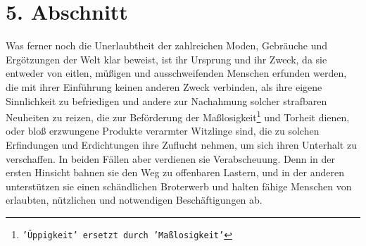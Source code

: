 \section{5. Abschnitt} \label{kap17_ab5}

Was ferner noch die Unerlaubtheit der zahlreichen Moden, Gebräuche und
Ergötzungen der Welt klar beweist, ist ihr Ursprung und ihr Zweck, da sie
entweder von eitlen, müßigen und ausschweifenden Menschen erfunden werden, die
mit ihrer Einführung keinen anderen Zweck verbinden, als ihre eigene
Sinnlichkeit
zu befriedigen und andere zur Nachahmung solcher strafbaren Neuheiten zu reizen,
die zur Beförderung der Maßlosigkeit\footnote{\texttt{'Üppigkeit' ersetzt durch
'Maßlosigkeit'}} und Torheit dienen,
oder bloß erzwungene
Produkte verarmter Witzlinge sind, die zu solchen Erfindungen und Erdichtungen
ihre Zuflucht nehmen, um sich ihren Unterhalt zu verschaffen. In beiden Fällen
aber verdienen sie Verabscheuung. Denn in der ersten Hinsicht bahnen sie den Weg
zu offenbaren Lastern, und in der anderen unterstützen sie einen schändlichen
Broterwerb und halten fähige Menschen von erlaubten,
nützlichen und
notwendigen Beschäftigungen ab.

\medskip

